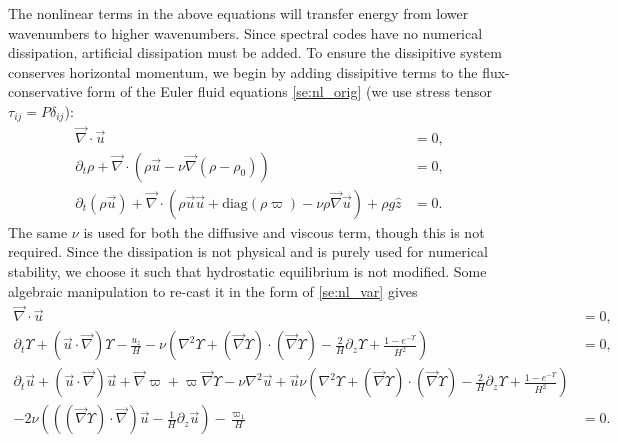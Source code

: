 \documentclass[
        fleqn,
        usenatbib,
    ]{mnras}
\newcommand*{\p}[1]{\left(#1\right)}
\begin{document}
The nonlinear terms in the above equations will transfer energy from lower
wavenumbers to higher wavenumbers. Since spectral codes have no numerical
dissipation, artificial dissipation must be added. To ensure the dissipitive
system conserves horizontal momentum, we begin by adding dissipitive terms to
the flux-conservative form of the Euler fluid equations \autoref{se:nl_orig} (we
use stress tensor $\tau_{ij} = P\delta_{ij}$):
\begin{subequations}
    \begin{align}
        \vec{\nabla} \cdot \vec{u} &= 0,\\
        \partial_t \rho + \vec{\nabla} \cdot (\rho \vec{u} - \nu
            \vec{\nabla}(\rho - \rho_0)) &= 0,\label{eq:visc_cons_mom}\\
        \partial_t (\rho \vec{u}) + \vec{\nabla} \cdot (\rho \vec{u}
        \vec{u} +
            \mathrm{diag}(\rho \varpi) - \nu \rho \vec{\nabla}\vec{u}) + \rho g
            \hat{z} &= 0.
    \end{align}
\end{subequations}
The same $\nu$ is used for both the diffusive and viscous term, though this is
not required. Since the dissipation is not physical and is purely used for
numerical stability, we choose it such that hydrostatic equilibrium is not
modified. Some algebraic manipulation to re-cast it in the form of
\autoref{se:nl_var} gives
\begin{subequations}
    \begin{align}
        \vec{\nabla} \cdot \vec{u} &= 0,\\
        \partial_t \Upsilon + \p{\vec{u} \cdot \vec{\nabla}} \Upsilon -
            \frac{u_z}{H} - \nu\p{\nabla^2 \Upsilon + \p{\vec{\nabla}
            \Upsilon} \cdot \p{\vec{\nabla}\Upsilon} - \frac{2}{H}\partial_z
            \Upsilon + \frac{1 - e^{-\Upsilon}}{H^2}} &= 0,\\
        \partial_t \vec{u} + \p{\vec{u} \cdot \vec{\nabla}}\vec{u} +
            \vec{\nabla} \varpi + \varpi \vec{\nabla} \Upsilon - \nu \nabla^2
            \vec{u} + \vec{u} \nu\p{\nabla^2 \Upsilon + \p{\vec{\nabla}
            \Upsilon} \cdot \p{\vec{\nabla}\Upsilon} - \frac{2}{H}\partial_z
            \Upsilon + \frac{1 - e^{-\Upsilon}}{H^2}}&{}\nonumber\\
        - 2\nu \p{\p{\p{\vec{\nabla}\Upsilon} \cdot \vec{\nabla}}\vec{u} -
            \frac{1}{H}\partial_z \vec{u}} - \frac{\varpi_1}{H} &= 0.
    \end{align}
\end{subequations}
\end{document}
